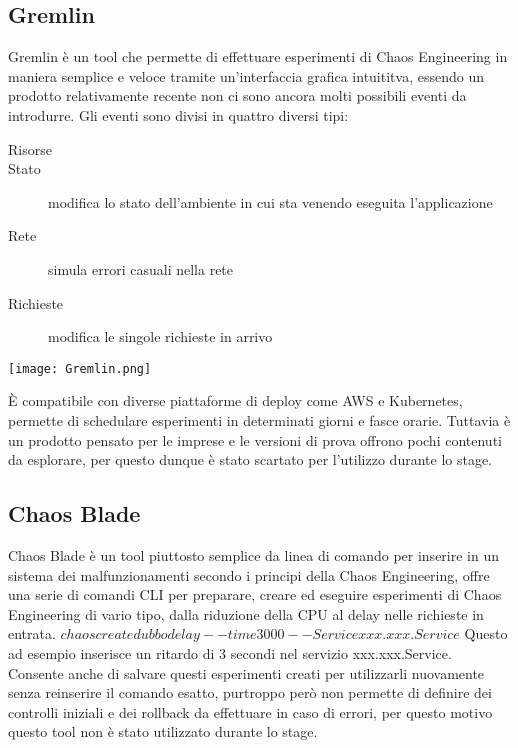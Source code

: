 \subsection{Gremlin}
Gremlin è un tool che permette di effettuare esperimenti di Chaos Engineering in maniera semplice e veloce tramite un'interfaccia grafica intuititva, essendo un prodotto relativamente recente non ci sono ancora molti possibili eventi da introdurre.
Gli eventi sono divisi in quattro diversi tipi:
\begin{description}
    \item[Risorse]
    \item[Stato] modifica lo stato dell'ambiente in cui sta venendo eseguita l'applicazione
    \item[Rete] simula errori casuali nella rete
    \item[Richieste] modifica le singole richieste in arrivo    
\end{description}
\begin{center}
    \centering
    \texttt{[image: Gremlin.png]}
    \label{tab:gremlin}
\end{center}
È compatibile con diverse piattaforme di deploy come AWS e Kubernetes, permette di schedulare esperimenti in determinati giorni e fasce orarie.
Tuttavia è un prodotto pensato per le imprese e le versioni di prova offrono pochi contenuti da esplorare, per questo dunque è stato scartato per l'utilizzo durante lo stage.

\subsection{Chaos Blade}
Chaos Blade è un tool piuttosto semplice da linea di comando per inserire in un sistema dei malfunzionamenti secondo i principi della Chaos Engineering, offre una serie di comandi CLI per preparare, creare ed eseguire esperimenti di Chaos Engineering di vario tipo, dalla riduzione della CPU al delay nelle richieste in entrata.
\begin{math}
    chaos create dubbo delay --time 3000 --Service xxx.xxx.Service
\end{math}
Questo ad esempio inserisce un ritardo di 3 secondi nel servizio xxx.xxx.Service.
Consente anche di salvare questi esperimenti creati per utilizzarli nuovamente senza reinserire il comando esatto, purtroppo però non permette di definire dei controlli iniziali e dei rollback da effettuare in caso di errori, per questo motivo questo tool non è stato utilizzato durante lo stage.

